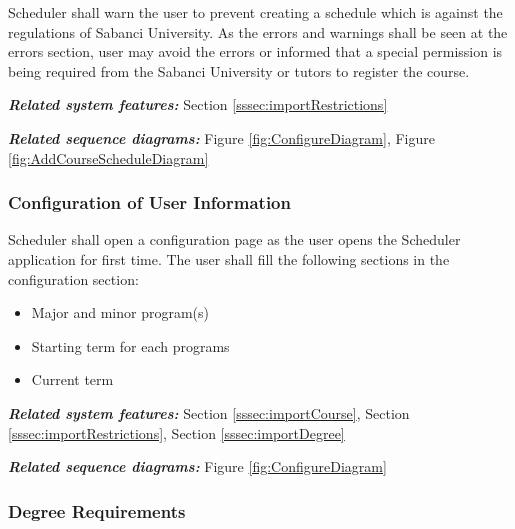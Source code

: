 \documentclass[twoside,letterpaper]{article}
\begin{document}
{\color{black}
	Scheduler shall warn the user to prevent creating a schedule which is against the regulations of Sabanci University. As the errors and warnings shall be seen at the errors section, user may avoid the errors or informed that a special permission is being required from the Sabanci University or tutors to register the course.}
	
\smallskip

{\color{black}
\emph{\textbf{Related system features:}} Section \ref{sssec:importRestrictions}}

\smallskip

{\color{black}
\emph{\textbf{Related sequence diagrams:}} Figure \ref{fig:ConfigureDiagram}, Figure \ref{fig:AddCourseScheduleDiagram}}

\clearpage

\subsubsection[Configuration of User Information
]{\rmfamily\bfseries\color{black}
Configuration of User Information}

{\color{black}
Scheduler shall open a configuration page as the user opens the Scheduler application for first time. The user shall fill the following sections in the configuration section:}

\begin{itemize}
			\item Major and minor program(s)
			\item Starting term for each programs
			\item Current term	
		\end{itemize}
	
\smallskip

{\color{black}
\emph{\textbf{Related system features:}} Section \ref{sssec:importCourse}, Section \ref{sssec:importRestrictions}, Section \ref{sssec:importDegree}}

\smallskip

{\color{black}
\emph{\textbf{Related sequence diagrams:}} Figure \ref{fig:ConfigureDiagram}}



\subsubsection[Degree Requirements
]{\rmfamily\bfseries\color{black}
Degree Requirements}
\end{document}
